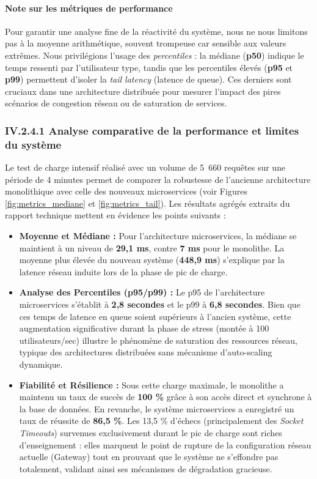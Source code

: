 \paragraph{Note sur les métriques de performance}
Pour garantir une analyse fine de la réactivité du système, nous ne nous limitons pas à la moyenne arithmétique, souvent trompeuse car sensible aux valeurs extrêmes. Nous privilégions l'usage des \textit{percentiles} : la médiane (\textbf{p50}) indique le temps ressenti par l'utilisateur type, tandis que les percentiles élevés (\textbf{p95} et \textbf{p99}) permettent d'isoler la \textit{tail latency} (latence de queue). Ces derniers sont cruciaux dans une architecture distribuée pour mesurer l'impact des pires scénarios de congestion réseau ou de saturation de services.

\subsubsection{IV.2.4.1 Analyse comparative de la performance et limites du système}
Le test de charge intensif réalisé avec un volume de 5~660 requêtes sur une période de 4 minutes permet de comparer la robustesse de l'ancienne architecture monolithique avec celle des nouveaux microservices (voir Figures \ref{fig:metrics_mediane} et \ref{fig:metrics_tail}). Les résultats agrégés extraits du rapport technique mettent en évidence les points suivants :

\begin{itemize}
    \item \textbf{Moyenne et Médiane :} Pour l'architecture microservices, la médiane se maintient à un niveau de \textbf{29,1 ms}, contre \textbf{7 ms} pour le monolithe. La moyenne plus élevée du nouveau système (\textbf{448,9 ms}) s'explique par la latence réseau induite lors de la phase de pic de charge.
    \item \textbf{Analyse des Percentiles (p95/p99) :} Le p95 de l'architecture microservices s'établit à \textbf{2,8 secondes} et le p99 à \textbf{6,8 secondes}. Bien que ces temps de latence en queue soient supérieurs à l'ancien système, cette augmentation significative durant la phase de stress (montée à 100 utilisateurs/sec) illustre le phénomène de saturation des ressources réseau, typique des architectures distribuées sans mécanisme d'auto-scaling dynamique.
    \item \textbf{Fiabilité et Résilience :} Sous cette charge maximale, le monolithe a maintenu un taux de succès de \textbf{100 \%} grâce à son accès direct et synchrone à la base de données. En revanche, le système microservices a enregistré un taux de réussite de \textbf{86,5 \%}. Les 13,5 \% d'échecs (principalement des \textit{Socket Timeouts}) survenues exclusivement durant le pic de charge sont riches d'enseignement : elles marquent le point de rupture de la configuration réseau actuelle (Gateway) tout en prouvant que le système ne s'effondre pas totalement, validant ainsi ses mécanismes de dégradation gracieuse.
\end{itemize}

